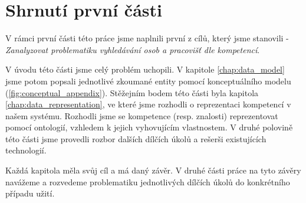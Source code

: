 \chapter{Shrnutí první části}
V rámci první části této práce jsme naplnili první z cílů, který jsme stanovili - \textit{Zanalyzovat problematiku vyhledávání osob a pracovišť dle kompetencí}.\par
V úvodu této části jsme celý problém uchopili. V kapitole \ref{chap:data_model} jsme potom popsali jednotlivé zkoumané entity pomocí konceptuálního modelu (\ref{fig:conceptual_appendix}). Stěžejním bodem této části byla kapitola \ref{chap:data_representation}, ve které jsme rozhodli o reprezentaci kompetencí v našem systému. Rozhodli jsme se kompetence (resp. znalosti) reprezentovat pomocí ontologií, vzhledem k jejich vyhovujícím vlastnostem. V druhé polovině této části jsme provedli rozbor dalších dílčích úkolů a rešerši existujících technologií.\par
Každá kapitola měla svůj cíl a má daný závěr. V druhé části práce na tyto závěry navážeme a rozvedeme problematiku jednotlivých dílčích úkolů do konkrétního případu užití. 

